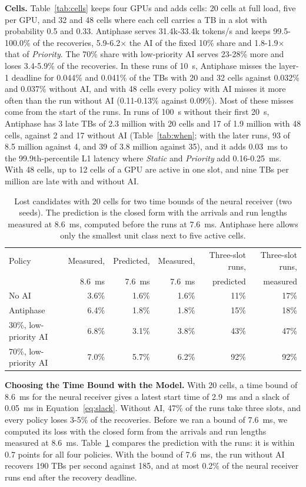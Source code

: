 \documentclass[acmsmall,screen,review,anonymous]{acmart}
\newcommand{\sys}{Antiphase\xspace}
\begin{document}
\noindent\textbf{Cells.} Table~\ref{tab:cells} keeps four GPUs and adds cells: 20 cells at full load, five
per GPU, and 32 and 48 cells where each cell carries a TB in a slot with probability 0.5 and 0.33. \sys
serves 31.4k-33.4k tokens/s and keeps 99.5-100.0\% of the recoveries, 5.9-6.2$\times$ the AI of the fixed
10\% share and 1.8-1.9$\times$ that of \textit{Priority}. The 70\% share with low-priority
AI serves 23-28\% more and loses 3.4-5.9\% of the recoveries. In these runs of 10~s, \sys misses the
layer-1 deadline for 0.044\% and 0.041\% of the TBs with 20 and 32 cells against 0.032\% and 0.037\% without
AI, and with 48 cells every policy with AI misses it more often than the run without AI (0.11-0.13\% against
0.09\%). Most of these misses come from the start of the runs. In runs of 100~s without their first 20~s, \sys
has 3 late TBs of 2.3 million with 20 cells and 17 of 1.9 million with 48 cells, against 2 and 17 without AI
(Table~\ref{tab:when}; with the later runs, 93 of 8.5 million against 4, and 39 of 3.8 million against 35), and it adds 0.03~ms to the 99.9th-percentile L1 latency where \textit{Static} and
\textit{Priority} add 0.16-0.25~ms. With 48 cells, up to 12 cells of a GPU are active in one slot, and
nine TBs per million are late with and without AI.

\begin{table}[t]
\caption{Lost candidates with 20 cells for two time bounds of the neural receiver (two seeds). The
prediction is the closed form with the arrivals and run lengths measured at 8.6~ms, computed before the
runs at 7.6~ms. \sys here allows only the smallest unit class next to five active cells.}
\label{tab:bound}
\footnotesize
\begin{tabular}{@{}lrrrrr@{}}
\toprule
Policy & Measured, & Predicted, & Measured, & Three-slot runs, & Three-slot runs, \\
 & 8.6~ms & 7.6~ms & 7.6~ms & predicted & measured \\
\midrule
No AI & 3.6\% & 1.6\% & 1.6\% & 11\% & 17\% \\
\sys & 6.4\% & 1.8\% & 1.8\% & 15\% & 18\% \\
30\%, low-priority AI & 6.8\% & 3.1\% & 3.8\% & 43\% & 47\% \\
70\%, low-priority AI & 7.0\% & 5.7\% & 6.2\% & 92\% & 92\% \\
\bottomrule
\end{tabular}
\end{table}

\noindent\textbf{Choosing the Time Bound with the Model.} With 20 cells, a time bound of 8.6~ms for the
neural receiver gives a latest start time of 2.9~ms and a slack of 0.05~ms in Equation~\ref{eq:slack}.
Without AI, 47\% of the runs take three slots, and every policy loses 3-5\% of the recoveries. Before we
ran a bound of 7.6~ms, we computed its loss with the closed form from the arrivals and run lengths measured
at 8.6~ms. Table~\ref{tab:bound} compares the prediction with the runs: it is within 0.7 points for all four
policies. With the bound of 7.6~ms, the run without AI recovers 190 TBs per second against 185, and at most
0.2\% of the neural receiver runs end after the recovery deadline.
\end{document}
